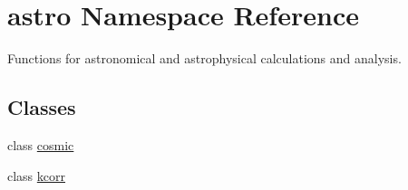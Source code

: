 \hypertarget{namespaceastro}{}\section{astro Namespace Reference}
\label{namespaceastro}


Functions for astronomical and astrophysical calculations and analysis.  


\subsection*{Classes}
\begin{DoxyCompactItemize}
\item 
class \hyperlink{classastro_1_1cosmic}{cosmic}
\item 
class \hyperlink{classastro_1_1kcorr}{kcorr}
\end{DoxyCompactItemize}
